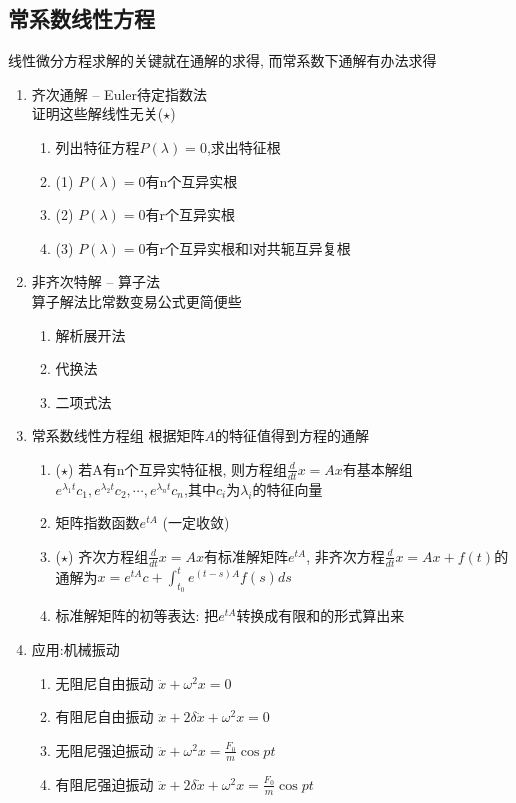 \subsection{常系数线性方程}
线性微分方程求解的关键就在通解的求得, 而常系数下通解有办法求得
\begin{enumerate}
    \item 齐次通解 -- Euler待定指数法\\
    证明这些解线性无关($\star$)
    \begin{enumerate}
        \item 列出特征方程$P(\lambda)=0$,求出特征根
        \item (1) $P(\lambda)=0$有n个互异实根
        \item (2) $P(\lambda)=0$有r个互异实根
        \item (3) $P(\lambda)=0$有r个互异实根和l对共轭互异复根
    \end{enumerate}
    \item 非齐次特解 -- 算子法\\
    算子解法比常数变易公式更简便些
    \begin{enumerate}
        \item 解析展开法
        \item 代换法
        \item 二项式法
    \end{enumerate}
    \item 常系数线性方程组
    根据矩阵$A$的特征值得到方程的通解
    \begin{enumerate}
        \item ($\star$) 若A有n个互异实特征根, 则方程组$\frac{d}{dt}x=Ax$有基本解组$e^{\lambda_{1}t}c_1, e^{\lambda_{2}t}c_2, \cdots, e^{\lambda_{n}t}c_n$,其中$c_i$为$\lambda_i$的特征向量
        \item 矩阵指数函数$e^{tA}$ (一定收敛)
        \item ($\star$) 齐次方程组$\frac{d}{dt}x =Ax$有标准解矩阵$e^{tA}$, 
        非齐次方程$\frac{d}{dt}x=Ax+f(t)$的通解为$x=e^{tA}c + \int_{t_0}^{t} e^{(t-s)A}f(s)ds$
        \item 标准解矩阵的初等表达: 把$e^{tA}$转换成有限和的形式算出来
    \end{enumerate}
    \item 应用:机械振动
    \begin{enumerate}
        \item 无阻尼自由振动 $\ddot{x}+\omega^2 x=0$
        \item 有阻尼自由振动 $\ddot{x}+2\delta \dot{x}+\omega^2 x=0$
        \item 无阻尼强迫振动 $\ddot{x}+\omega^2 x = \frac{F_0}{m}\cos pt$
        \item 有阻尼强迫振动 $\ddot{x}+2\delta \dot{x}+\omega^2 x = \frac{F_0}{m}\cos pt$
    \end{enumerate}
\end{enumerate}

